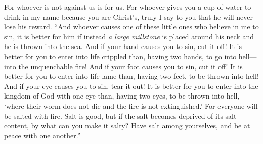 \begin{biblechapter}
\verse For whoever is not against us is for us.
\verse For whoever gives you a cup of water to drink in my name because you are Christ’s, truly I say to you that he will never lose his reward.
 “And whoever causes one of these little ones who believe in me to sin, it is better for him if instead \textit{a large millstone} is placed around his neck and he is thrown into the sea.
\verse And if your hand causes you to sin, cut it off! It is better for you to enter into life crippled than, having two hands, to go into hell—into the unquenchable fire!
\verse And if your foot causes you to sin, cut it off! It is better for you to enter into life lame than, having two feet, to be thrown into hell!
\verse And if your eye causes you to sin, tear it out! It is better for you to enter into the kingdom of God with one eye than, having two eyes, to be thrown into hell,
\verse ‘where their worm does not die and the fire is not extinguished.’
\verse For everyone will be salted with fire.
\verse Salt is good, but if the salt becomes deprived of its salt content, by what can you make it salty? Have salt among yourselves, and be at peace with one another.”
\end{biblechapter}

